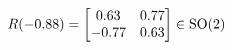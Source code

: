 \documentclass[preview]{standalone}
\begin{document}
\begin{align*}
\special{dvisvgm:raw <g id='unique000'>}R(-0.88) = \begin{bmatrix} 0.63 & 0.77 \\ -0.77 & 0.63 \end{bmatrix} \in \text{SO}(2)\special{dvisvgm:raw </g>}
\end{align*}
\end{document}
